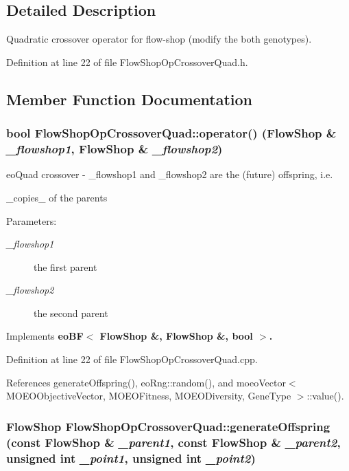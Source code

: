 \subsection{Detailed Description}
Quadratic crossover operator for flow-shop (modify the both genotypes). 



Definition at line 22 of file Flow\-Shop\-Op\-Crossover\-Quad.h.

\subsection{Member Function Documentation}
\subsubsection{\setlength{\rightskip}{0pt plus 5cm}bool Flow\-Shop\-Op\-Crossover\-Quad::operator() (\bf{Flow\-Shop} \& {\em \_\-flowshop1}, \bf{Flow\-Shop} \& {\em \_\-flowshop2})\hspace{0.3cm}{\tt  [virtual]}}\label{classFlowShopOpCrossoverQuad_92f70807bea24d3c233af580e2c55e3a}


eo\-Quad crossover - \_\-flowshop1 and \_\-flowshop2 are the (future) offspring, i.e. 

\_\-copies\_\- of the parents \begin{Desc}
\item[Parameters:]
\begin{description}
\item[{\em \_\-flowshop1}]the first parent \item[{\em \_\-flowshop2}]the second parent \end{description}
\end{Desc}


Implements \bf{eo\-BF$<$ Flow\-Shop \&, Flow\-Shop \&, bool $>$}.

Definition at line 22 of file Flow\-Shop\-Op\-Crossover\-Quad.cpp.

References generate\-Offspring(), eo\-Rng::random(), and moeo\-Vector$<$ MOEOObjective\-Vector, MOEOFitness, MOEODiversity, Gene\-Type $>$::value().
\subsubsection{\setlength{\rightskip}{0pt plus 5cm}\bf{Flow\-Shop} Flow\-Shop\-Op\-Crossover\-Quad::generate\-Offspring (const \bf{Flow\-Shop} \& {\em \_\-parent1}, const \bf{Flow\-Shop} \& {\em \_\-parent2}, unsigned int {\em \_\-point1}, unsigned int {\em \_\-point2})\hspace{0.3cm}{\tt  [private]}}\label{classFlowShopOpCrossoverQuad_cbc2f344a0a29861900f4846597564c3}


